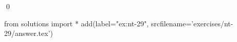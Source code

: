 
\begin{ex} 
  \label{ex:nt-29}
  
  \qed
\end{ex} 
\begin{python0}
from solutions import *
add(label="ex:nt-29",
    srcfilename='exercises/nt-29/answer.tex') 
\end{python0}
